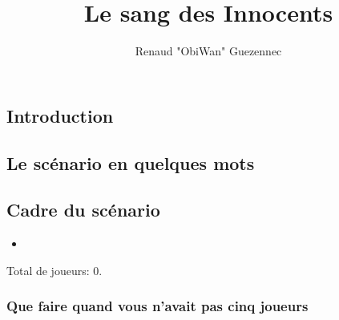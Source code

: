 \documentclass[oneside,12pt]{book}
\title{Le sang des Innocents}
\author{Renaud "ObiWan" Guezennec}
\date{}
\begin{document}
\maketitle \clearpage
\tableofcontents \clearpage
\listoffigures \clearpage

\begin{flushleft}
    \chapter{Introduction}
    \section{Le scénario en quelques mots}
    
    
    \section{Cadre du scénario}
       
 
    \begin{itemize}
    \item 
    \end{itemize}
    
    Total de joueurs: 0.
    
        \subsection{Que faire quand vous n'avait pas cinq joueurs}



\end{flushleft}
\end{document}
